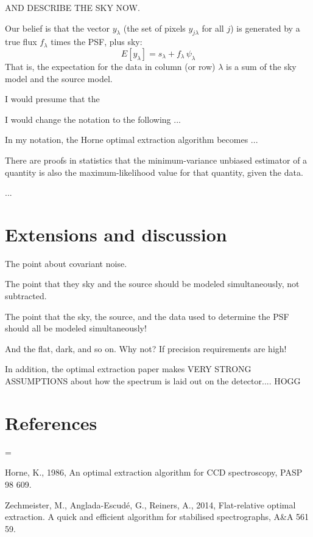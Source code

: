 \documentclass[12pt, letterpaper]{article}
\begin{document}
AND DESCRIBE THE SKY NOW.

Our belief is that the vector $y_{\lambda}$ (the set of pixels
$y_{j\lambda}$ for all $j$) is generated by a true flux $f_{\lambda}$
times the PSF, plus sky:
\begin{equation}
E[y_\lambda] = s_\lambda + f_\lambda\,\psi_\lambda
\end{equation}
That is, the expectation for the data in column (or row) $\lambda$ is
a sum of the sky model and the source model.

I would presume that the 

I would change the notation to the following ...

In my notation, the Horne optimal extraction algorithm becomes ...

There are proofs in statistics that the minimum-variance unbiased
estimator of a quantity is also the maximum-likelihood value for that
quantity, given the data.

...

\section{Extensions and discussion}

The point about covariant noise.

The point that they sky and the source should be modeled
simultaneously, not subtracted.

The point that the sky, the source, and the data used to determine the
PSF should all be modeled simultaneously!

And the flat, dark, and so on. Why not? If precision requirements are
high!

In addition, the optimal extraction paper makes VERY STRONG
ASSUMPTIONS about how the spectrum is laid out on the
detector.... HOGG

\section*{References}
\begin{list}{}{%
\rightmargin=0in
\leftmargin=\parindent
{}\leftmargin
{}\leftmargin
}
\item Horne, K., 1986,
An optimal extraction algorithm for CCD spectroscopy,
PASP 98 609.
\item Zechmeister, M., Anglada-Escud\'e, G., Reiners, A., 2014,
Flat-relative optimal extraction. A quick and efficient algorithm for stabilised spectrographs,
A\&A 561 59.
\end{list}
\end{document}
